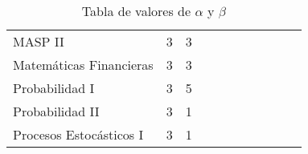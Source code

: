 \begin{table}[h!]
\begin{tabular}{l|ll|llllllll}
MASP II                      & 3        & 3                   & \cellcolor{blue!25} &                     &                     &                     &                     &                     &                     &                     \\
Matemáticas Financieras      & 3        & 3                   & \cellcolor{blue!25} &                     &                     &                     &                     &                     &                     &                     \\
Probabilidad I               & 3        & 5                   & \cellcolor{blue!25} & \cellcolor{blue!25} &                     &                     &                     &                     & \cellcolor{blue!25} &                     \\
Probabilidad II              & 3        & 1 & \cellcolor{blue!25} &                     &                     &                     &                     &                     & \cellcolor{blue!25} &                     \\
Procesos Estocásticos I      & 3        & 1 & \cellcolor{blue!25} &                     &                     &                     &                     &                     & \cellcolor{blue!25} &                    
\end{tabular}
\caption{Tabla de valores de $\alpha$ y $\beta$}
\label{tab:obli}
\end{table}
\twocolumn